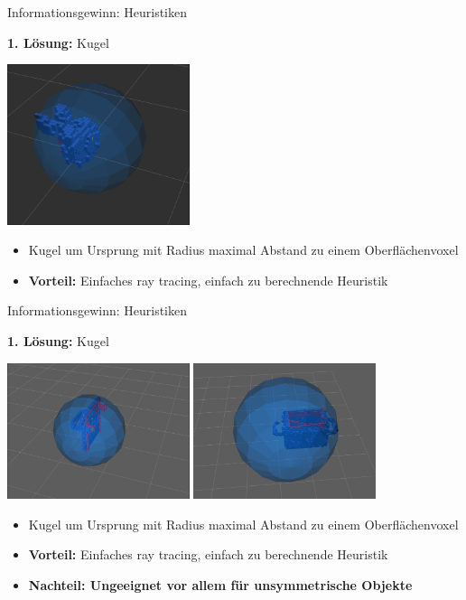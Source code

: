\documentclass{beamer}
\begin{document}
\begin{frame}{Informationsgewinn: Heuristiken}
	\begin{block}{\textbf{1. Lösung:} Kugel}
		\begin{center}
			\includegraphics[width=0.4\textwidth]{Graphics/sphere.png}
		\end{center}
		\begin{itemize}
			\item  Kugel um Ursprung mit Radius maximal Abstand zu einem Oberflächenvoxel
			\item \textbf{Vorteil:} Einfaches ray tracing, einfach zu berechnende Heuristik
		\end{itemize}
	\end{block}
\end{frame}

\begin{frame}{Informationsgewinn: Heuristiken}
	\begin{block}{\textbf{1. Lösung:} Kugel}
		\begin{center}
			\includegraphics[width=0.4\textwidth]{Graphics/sphere_ok.png}
			\includegraphics[width=0.4\textwidth]{Graphics/sphere_too_big.png}
		\end{center}
		\begin{itemize}
			\item Kugel um Ursprung mit Radius maximal Abstand zu einem Oberflächenvoxel
			\item \textbf{Vorteil:} Einfaches ray tracing, einfach zu berechnende Heuristik
			\item \textbf{Nachteil: Ungeeignet vor allem für unsymmetrische Objekte}
		\end{itemize}
	\end{block}
\end{frame}
\end{document}
